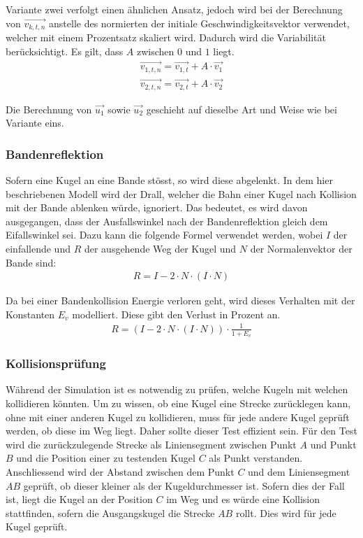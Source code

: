 Variante zwei verfolgt einen ähnlichen Ansatz, jedoch wird bei der Berechnung von $\vec{v_{k,t,n}}$ anstelle des normierten
der initiale Geschwindigkeitsvektor verwendet, welcher mit einem Prozentsatz skaliert wird. Dadurch wird die Variabilität
berücksichtigt. Es gilt, dass $A$ zwischen $0$ und $1$ liegt.
\begin{align}
    \vec{v_{1,t,n}} = \vec{v_{1,t}} + A \cdot \vec{v_1}\\
    \vec{v_{2,t,n}} = \vec{v_{2,t}} + A \cdot \vec{v_2}
\end{align}

Die Berechnung von $\vec{u_1}$ sowie $\vec{u_2}$ geschieht auf dieselbe Art und Weise wie bei Variante eins.

\newpage
\subsubsection{Bandenreflektion}
Sofern eine Kugel an eine Bande stösst, so wird diese abgelenkt. In dem hier beschriebenen Modell wird der Drall\cite{wiki.spin:1},
welcher die Bahn einer Kugel nach Kollision mit der Bande ablenken würde, ignoriert.
Das bedeutet, es wird davon ausgegangen, dass der Ausfallswinkel nach der Bandenreflektion gleich dem Eifallswinkel sei.
Dazu kann die folgende Formel\cite{paulbourke.reflected_ray:1} verwendet werden, wobei $I$ der einfallende
und $R$ der ausgehende Weg der Kugel und $N$ der Normalenvektor der Bande sind:
\begin{align}
    R = I - 2 \cdot N \cdot (I \cdot N)
\end{align}

Da bei einer Bandenkollision Energie verloren geht, wird dieses Verhalten mit der Konstanten $E_v$ modelliert.
Diese gibt den Verlust in Prozent an.
\begin{align}
    R = (I - 2 \cdot N \cdot (I \cdot N)) \cdot \frac{1}{1 + E_v}
\end{align}
\subsubsection{Kollisionsprüfung}
Während der Simulation ist es notwendig zu prüfen, welche Kugeln mit welchen kollidieren könnten.
Um zu wissen, ob eine Kugel eine Strecke zurücklegen kann, ohne mit einer anderen Kugel zu kollidieren,
muss für jede andere Kugel geprüft werden, ob diese im Weg liegt. Daher sollte dieser Test effizient sein.
Für den Test wird die zurückzulegende Strecke als Liniensegment zwischen Punkt $A$ und Punkt $B$ und die Position
einer zu testenden Kugel $C$ als Punkt verstanden. Anschliessend wird der Abstand zwischen dem Punkt $C$ und dem
Liniensegment $AB$ geprüft, ob dieser kleiner als der Kugeldurchmesser ist. Sofern dies der Fall ist, liegt die Kugel an
der Position $C$ im Weg und es würde eine Kollision stattfinden, sofern die Ausgangskugel die Strecke $AB$ rollt.
Dies wird für jede Kugel geprüft.

